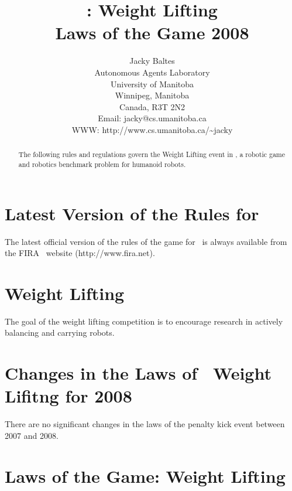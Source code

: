\documentclass[12pt]{hurocup}
\begin{document}
\title{\HuroCup: Weight Lifting\\
  Laws of the Game 2008}


\author{Jacky Baltes\\
Autonomous Agents Laboratory\\
University of Manitoba\\
Winnipeg, Manitoba\\
Canada, R3T 2N2\\
Email: jacky@cs.umanitoba.ca\\
WWW: http://www.cs.umanitoba.ca/\~{ }jacky
}

\maketitle
\begin{abstract}
The following rules and regulations govern the Weight Lifting event in
\HuroCup, a robotic game and robotics benchmark problem for humanoid
robots.
%
\end{abstract}

\section*{Latest Version of the Rules for \HuroCup}
\label{sec:updates}

The latest official version of the rules of the game for \HuroCup\ is
always available from the FIRA \HuroCup\ website (http://www.fira.net).

\newpage

\section{Weight Lifting}
\label{sec:weight-lifting} 

The goal of the weight lifting competition is to encourage research in
actively balancing and carrying robots.

\section{Changes in the Laws of \HuroCup\ Weight Lifitng for 2008}

There are no significant changes in the laws of the penalty kick event
between 2007 and 2008.

\section{Laws of the Game: Weight Lifting}
\label{sec:weight-lifting-laws}
\end{document}
